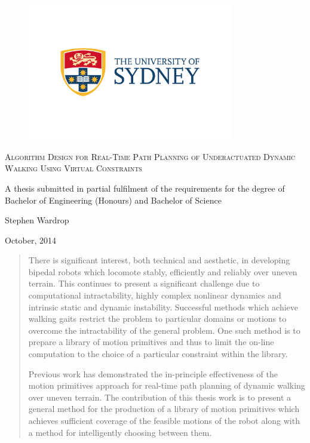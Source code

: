 \thispagestyle{empty}
\begin{titlepage}
\setcounter{page}{1}
\begin{center}

\begin{figure}[H]
\centering
\includegraphics[width = 0.8\textwidth]{Images/usyd.jpg}
\end{figure}

\doublespacing
\textsc{ \LARGE Algorithm Design for Real-Time Path Planning of Underactuated Dynamic Walking Using Virtual Constraints}

\vspace{2cm}

\singlespacing
A thesis submitted in partial fulfilment of the requirements for the degree of \\ Bachelor of Engineering (Honours) and Bachelor of Science

\vspace{2cm}

\large
Stephen Wardrop

\vfill

October, 2014

\end{center}
\end{titlepage}
\pagebreak

\begin{abstract}
\thispagestyle{plain}
\setcounter{page}{2}
There is significant interest, both technical and aesthetic, in developing bipedal robots which locomote stably, efficiently and reliably over uneven terrain. This continues to present a significant challenge due to computational intractability, highly complex nonlinear dynamics and intrinsic static and dynamic instability. Successful methods which achieve walking gaits restrict the problem to particular domains or motions to overcome the intractability of the general problem. One such method is to prepare a library of motion primitives and thus to limit the on-line computation to the choice of a particular constraint within the library.

Previous work has demonstrated the in-principle effectiveness of the motion primitives approach for real-time path planning of dynamic walking over uneven terrain. The contribution of this thesis work is to present a general method for the production of a library of motion primitives which achieves sufficient coverage of the feasible motions of the robot along with a method for intelligently choosing between them.
\end{abstract}

